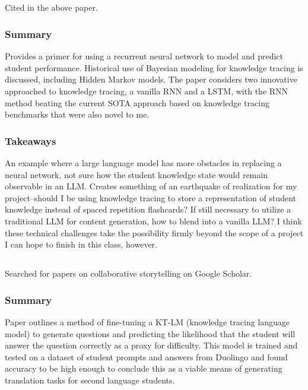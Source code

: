 \documentclass[
	letterpaper, %
]{jdf}
\begin{document}
\subsection{}
Cited in the above paper.

\subsubsection{Summary}
Provides a primer for using a recurrent neural network to model and predict student performance. Historical use of Bayesian modeling for knowledge tracing is discussed, including Hidden Markov models. The paper considers two innovative approached to knowledge tracing, a vanilla RNN and a LSTM, with the RNN method beating the current SOTA approach based on knowledge tracing benchmarks that were also novel to me.

\subsubsection{Takeaways}
An example where a large language model has more obstacles in replacing a neural network, not sure how the student knowledge state would remain observable in an LLM. Creates something of an earthquake of realization for my project–should I be using knowledge tracing to store a representation of student knowledge instead of spaced repetition flashcards? If still necessary to utilize a traditional LLM for content generation, how to blend into a vanilla LLM? I think these technical challenges take the possibility firmly beyond the scope of a project I can hope to finish in this class, however.

\subsection{}
Searched for papers on collaborative storytelling on Google Scholar.

\subsubsection{Summary}
Paper outlines a method of fine-tuning a KT-LM (knowledge tracing language model) to generate questions and predicting the likelihood that the student will answer the question correctly as a proxy for difficulty. This model is trained and tested on a dataset of student prompts and answers from Duolingo and found accuracy to be high enough to conclude this as a viable means of generating translation tasks for second language students. 
\end{document}
